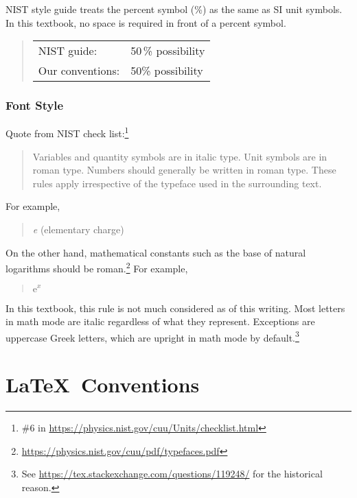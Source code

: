 NIST style guide treats the percent symbol (\%) as the same as SI unit
symbols.
In this textbook, no space is required in front of a percent symbol.

\begin{quote}
\begin{tabular}{ll}
  NIST guide:& 50\,\% possibility\\
  Our conventions:& 50\% possibility\\
\end{tabular}
\end{quote}

\subsubsection{Font Style}
\label{sec:app:styleguide:Font Style}

Quote from NIST check list:\footnote{
  \#6 in \url{https://physics.nist.gov/cuu/Units/checklist.html}
}

\begin{quote}
  Variables and quantity symbols are in italic type. Unit symbols
  are in roman type. Numbers should generally be written in roman
  type. These rules apply irrespective of the typeface used in
  the surrounding text.
\end{quote}

For example,
\begin{quote}
  {\textit e} (elementary charge)
\end{quote}

On the other hand, mathematical constants such as the base
of natural logarithms should be roman.\footnote{
  \url{https://physics.nist.gov/cuu/pdf/typefaces.pdf}
}
For example,

\begin{quote}
  $\mathrm{e}^x$
\end{quote}

In this textbook, this rule is not much considered as of this writing.
Most letters in math mode are italic regardless of what they
represent. Exceptions are uppercase Greek letters, which are upright
in math mode by default.\footnote{
  See \url{https://tex.stackexchange.com/questions/119248/}
  for the historical reason.}

\pagebreak %
\section{\LaTeX\ Conventions}
\label{sec:app:styleguide:LaTeX Conventions}

